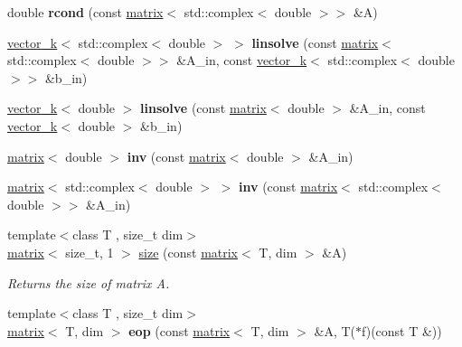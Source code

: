 \begin{DoxyCompactItemize}
\item 
\hypertarget{namespacekeycpp_a4d9a9dd04453e5a417f7a9eb8ae4391b}{double {\bfseries rcond} (const \hyperlink{classkeycpp_1_1matrix}{matrix}$<$ std\-::complex$<$ double $>$$>$ \&A)}\label{namespacekeycpp_a4d9a9dd04453e5a417f7a9eb8ae4391b}

\item 
\hypertarget{namespacekeycpp_aa0c91a82f4eadf681f9a690d6f309665}{\hyperlink{classkeycpp_1_1vector__k}{vector\-\_\-k}$<$ std\-::complex$<$ double $>$ $>$ {\bfseries linsolve} (const \hyperlink{classkeycpp_1_1matrix}{matrix}$<$ std\-::complex$<$ double $>$$>$ \&A\-\_\-in, const \hyperlink{classkeycpp_1_1vector__k}{vector\-\_\-k}$<$ std\-::complex$<$ double $>$$>$ \&b\-\_\-in)}\label{namespacekeycpp_aa0c91a82f4eadf681f9a690d6f309665}

\item 
\hypertarget{namespacekeycpp_a13a89a2c6d30c991f4de63ca8f62c0e1}{\hyperlink{classkeycpp_1_1vector__k}{vector\-\_\-k}$<$ double $>$ {\bfseries linsolve} (const \hyperlink{classkeycpp_1_1matrix}{matrix}$<$ double $>$ \&A\-\_\-in, const \hyperlink{classkeycpp_1_1vector__k}{vector\-\_\-k}$<$ double $>$ \&b\-\_\-in)}\label{namespacekeycpp_a13a89a2c6d30c991f4de63ca8f62c0e1}

\item 
\hypertarget{namespacekeycpp_adc96927cda2df7a6e8e2031941c43601}{\hyperlink{classkeycpp_1_1matrix}{matrix}$<$ double $>$ {\bfseries inv} (const \hyperlink{classkeycpp_1_1matrix}{matrix}$<$ double $>$ \&A\-\_\-in)}\label{namespacekeycpp_adc96927cda2df7a6e8e2031941c43601}

\item 
\hypertarget{namespacekeycpp_a9085342fc708fd5babae39321da3b89a}{\hyperlink{classkeycpp_1_1matrix}{matrix}$<$ std\-::complex$<$ double $>$ $>$ {\bfseries inv} (const \hyperlink{classkeycpp_1_1matrix}{matrix}$<$ std\-::complex$<$ double $>$$>$ \&A\-\_\-in)}\label{namespacekeycpp_a9085342fc708fd5babae39321da3b89a}

\item 
{\footnotesize template$<$class T , size\-\_\-t dim$>$ }\\\hyperlink{classkeycpp_1_1matrix}{matrix}$<$ size\-\_\-t, 1 $>$ \hyperlink{namespacekeycpp_acfe17126168656af54ae76ab6c487407}{size} (const \hyperlink{classkeycpp_1_1matrix}{matrix}$<$ T, dim $>$ \&A)
\begin{DoxyCompactList}\small\item\em Returns the size of matrix A. \end{DoxyCompactList}\item 
\hypertarget{namespacekeycpp_ac999bd518fb456aa9a4fbd2c04f007de}{{\footnotesize template$<$class T , size\-\_\-t dim$>$ }\\\hyperlink{classkeycpp_1_1matrix}{matrix}$<$ T, dim $>$ {\bfseries eop} (const \hyperlink{classkeycpp_1_1matrix}{matrix}$<$ T, dim $>$ \&A, T($\ast$f)(const T \&))}\label{namespacekeycpp_ac999bd518fb456aa9a4fbd2c04f007de}


\end{DoxyCompactItemize}
